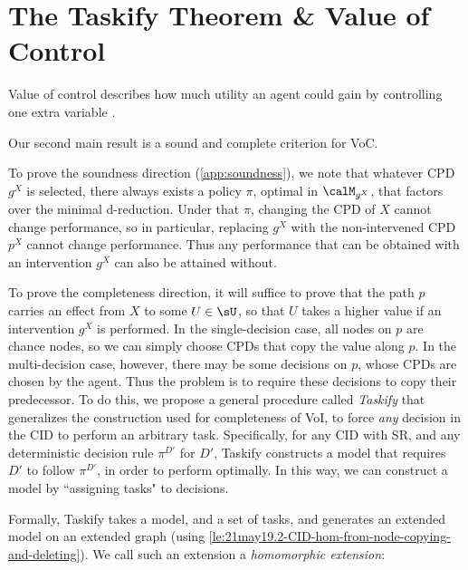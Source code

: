 \section{The Taskify Theorem \& Value of Control} \label{sec:voc-completeness-main} %
Value of control describes how much utility an agent could gain
by controlling one extra variable \citep{Matheson1990}.~



Our second main result is a sound and complete criterion for VoC.



To prove the soundness direction (\cref{app:soundness}), 
we note that whatever CPD $g^X$ is 
selected, there always exists a policy $\pi$, optimal in $\calM_{g^X}$, that
factors over the minimal d-reduction. Under that $\pi$, changing the CPD of 
$X$ cannot change performance, so in particular, replacing $g^X$ with the non-intervened CPD $p^X$ cannot change performance. Thus any performance that 
can be obtained with an intervention $g^X$ can also be attained without.



To prove the completeness direction, it will suffice to prove that the path $p$ 
carries an effect from $X$ to some $U \in \sU$, so that $U$ 
takes a higher value if an intervention $g^X$ is performed.
In the single-decision case, all nodes on $p$ are chance nodes, so we can simply choose CPDs that copy the value along $p$. 
In the multi-decision case, 
however, 
there may be some decisions on $p$, whose CPDs are chosen by the agent. Thus the problem is to require these decisions to copy their predecessor.
To do this, we propose a general procedure called \emph{Taskify}
that generalizes the construction used for completeness of VoI, 
to force \emph{any} decision in the CID to perform an arbitrary task. 
Specifically, for any CID with SR, and any deterministic decision rule $\pi^{D'}$ for $D'$, Taskify constructs a model that requires $D'$ to follow $\pi^{D'}$,
in order to perform optimally. In this way, we can construct a model by ``assigning tasks" to decisions.~

Formally, Taskify takes a model, and a set of tasks, and generates an extended model on an extended graph (using \cref{le:21may19.2-CID-hom-from-node-copying-and-deleting}). We call such an extension a \textit{homomorphic extension}:~



